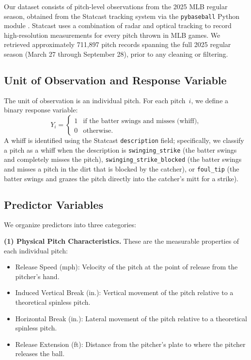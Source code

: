 \documentclass[11pt]{article}
\newcommand{\totalRaw}{711{,}897}        %
\begin{document}
Our dataset consists of pitch-level observations from the 2025 MLB regular season, obtained from the Statcast tracking system via the \texttt{pybaseball} Python module \citep{pybaseball}.
Statcast uses a combination of radar and optical tracking to record high-resolution measurements for every pitch thrown in MLB games.
We retrieved approximately \totalRaw{} pitch records spanning the full 2025 regular season (March 27 through September 28), prior to any cleaning or filtering.

\subsection{Unit of Observation and Response Variable}

The unit of observation is an individual pitch.
For each pitch~$i$, we define a binary response variable:
\[
   Y_i =
   \begin{cases}
   1 & \text{if the batter swings and misses (whiff)}, \\
   0 & \text{otherwise}.
   \end{cases}
\]
A whiff is identified using the Statcast \texttt{description} field; specifically, 
we classify a pitch as a whiff when the description is \texttt{swinging\_strike} 
(the batter swings and completely misses the pitch), \texttt{swinging\_strike\_blocked} 
(the batter swings and misses a pitch in the dirt that is blocked by the catcher), 
or \texttt{foul\_tip} (the batter swings and grazes the pitch directly into 
the catcher's mitt for a strike).

\subsection{Predictor Variables}

We organize predictors into three categories:

\medskip
\noindent\textbf{(1) Physical Pitch Characteristics.}
These are the measurable properties of each individual pitch:
\begin{itemize}[nosep]
    \item Release Speed (mph): Velocity of the pitch at the point of release from the pitcher's hand.
    \item Induced Vertical Break (in.): Vertical movement of the pitch relative to a theoretical spinless pitch.
    \item Horizontal Break (in.): Lateral movement of the pitch relative to a theoretical spinless pitch.
    \item Release Extension (ft): Distance from the pitcher's plate to where the pitcher releases the ball.
\end{itemize}
\end{document}
